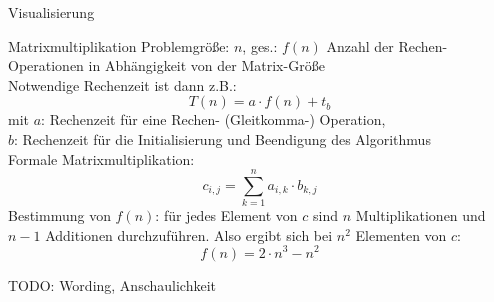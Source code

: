 \begin{example}[Komplexitätsklassen]{Visualisierung}
    \centering
\end{example}

\begin{example}[Komplexität]{Matrixmultiplikation}
    Problemgröße: $n$, ges.: $f(n)$ Anzahl der Rechen-Operationen in Abhängigkeit von der Matrix-Größe\\
    Notwendige Rechenzeit ist dann z.B.:
    \[T(n)=a\cdot f(n) + t_b\]
    mit $a$: Rechenzeit für eine Rechen- (Gleitkomma-) Operation,\\
    $b$: Rechenzeit für die Initialisierung und Beendigung des Algorithmus\\
    Formale Matrixmultiplikation:
    \[c_{i, j} = \sum\limits_{k=1}^{n}a_{i, k}\cdot b_{k, j}\]
    Bestimmung von $f(n)$: für jedes Element von $c$ sind $n$ Multiplikationen und $n-1$ Additionen durchzuführen.
    Also ergibt sich bei $n^2$ Elementen von $c$:
    \[f(n)=2\cdot n^3 - n^2\]

    TODO: Wording, Anschaulichkeit
\end{example}

